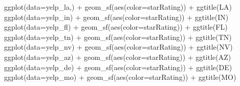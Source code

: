 \documentclass[
  12pt,
  letterpaper,
  DIV=11,
  numbers=noendperiod]{scrartcl}
\newenvironment{Shaded}{\begin{snugshade}}{\end{snugshade}}
\newcommand{\AttributeTok}[1]{\textcolor[rgb]{0.98,0.46,0.51}{#1}}
\newcommand{\FunctionTok}[1]{\textcolor[rgb]{0.70,0.57,0.94}{#1}}
\newcommand{\NormalTok}[1]{\textcolor[rgb]{0.88,0.89,0.91}{#1}}
\newcommand{\SpecialCharTok}[1]{\textcolor[rgb]{0.47,0.72,1.00}{#1}}
\newcommand{\StringTok}[1]{\textcolor[rgb]{0.62,0.80,1.00}{#1}}
\begin{document}
\begin{Shaded}
\begin{Highlighting}[]
\FunctionTok{ggplot}\NormalTok{(}\AttributeTok{data=}\NormalTok{yelp\_la,) }\SpecialCharTok{+} \FunctionTok{geom\_sf}\NormalTok{(}\FunctionTok{aes}\NormalTok{(}\AttributeTok{color=}\NormalTok{starRating)) }\SpecialCharTok{+} \FunctionTok{ggtitle}\NormalTok{(}\StringTok{\textquotesingle{}LA\textquotesingle{}}\NormalTok{)}
\FunctionTok{ggplot}\NormalTok{(}\AttributeTok{data=}\NormalTok{yelp\_in) }\SpecialCharTok{+} \FunctionTok{geom\_sf}\NormalTok{(}\FunctionTok{aes}\NormalTok{(}\AttributeTok{color=}\NormalTok{starRating)) }\SpecialCharTok{+} \FunctionTok{ggtitle}\NormalTok{(}\StringTok{\textquotesingle{}IN\textquotesingle{}}\NormalTok{)}
\FunctionTok{ggplot}\NormalTok{(}\AttributeTok{data=}\NormalTok{yelp\_fl) }\SpecialCharTok{+} \FunctionTok{geom\_sf}\NormalTok{(}\FunctionTok{aes}\NormalTok{(}\AttributeTok{color=}\NormalTok{starRating)) }\SpecialCharTok{+} \FunctionTok{ggtitle}\NormalTok{(}\StringTok{\textquotesingle{}FL\textquotesingle{}}\NormalTok{)}
\FunctionTok{ggplot}\NormalTok{(}\AttributeTok{data=}\NormalTok{yelp\_tn) }\SpecialCharTok{+} \FunctionTok{geom\_sf}\NormalTok{(}\FunctionTok{aes}\NormalTok{(}\AttributeTok{color=}\NormalTok{starRating)) }\SpecialCharTok{+} \FunctionTok{ggtitle}\NormalTok{(}\StringTok{\textquotesingle{}TN\textquotesingle{}}\NormalTok{)}
\FunctionTok{ggplot}\NormalTok{(}\AttributeTok{data=}\NormalTok{yelp\_nv) }\SpecialCharTok{+} \FunctionTok{geom\_sf}\NormalTok{(}\FunctionTok{aes}\NormalTok{(}\AttributeTok{color=}\NormalTok{starRating)) }\SpecialCharTok{+} \FunctionTok{ggtitle}\NormalTok{(}\StringTok{\textquotesingle{}NV\textquotesingle{}}\NormalTok{)}
\FunctionTok{ggplot}\NormalTok{(}\AttributeTok{data=}\NormalTok{yelp\_az) }\SpecialCharTok{+} \FunctionTok{geom\_sf}\NormalTok{(}\FunctionTok{aes}\NormalTok{(}\AttributeTok{color=}\NormalTok{starRating)) }\SpecialCharTok{+} \FunctionTok{ggtitle}\NormalTok{(}\StringTok{\textquotesingle{}AZ\textquotesingle{}}\NormalTok{)}
\FunctionTok{ggplot}\NormalTok{(}\AttributeTok{data=}\NormalTok{yelp\_de) }\SpecialCharTok{+} \FunctionTok{geom\_sf}\NormalTok{(}\FunctionTok{aes}\NormalTok{(}\AttributeTok{color=}\NormalTok{starRating)) }\SpecialCharTok{+} \FunctionTok{ggtitle}\NormalTok{(}\StringTok{\textquotesingle{}DE\textquotesingle{}}\NormalTok{)}
\FunctionTok{ggplot}\NormalTok{(}\AttributeTok{data=}\NormalTok{yelp\_mo) }\SpecialCharTok{+} \FunctionTok{geom\_sf}\NormalTok{(}\FunctionTok{aes}\NormalTok{(}\AttributeTok{color=}\NormalTok{starRating)) }\SpecialCharTok{+} \FunctionTok{ggtitle}\NormalTok{(}\StringTok{\textquotesingle{}MO\textquotesingle{}}\NormalTok{)}

\end{Highlighting}
\end{Shaded}
\end{document}
